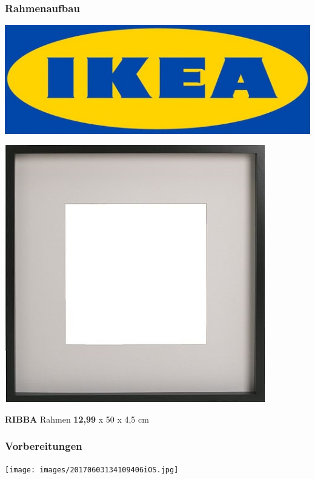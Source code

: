 \documentclass[11pt]{beamer}
\begin{document}
	\begin{frame}
		\frametitle{Rahmenaufbau}
		\begin{center}
			\includegraphics[scale = 0.2]{images/ikea.jpg}
		\end{center}
		\begin{center}
			\begin{minipage}[b]{0.4\textwidth}
				\includegraphics[scale = 0.35]{images/ribba-rahmen-schwarz.jpg}
			\end{minipage}
			\begin{minipage}[b]{0.4\textwidth}
				\textbf{RIBBA} \linebreak
				Rahmen \linebreak
				\textbf{12,99}  x 50 x 4,5 cm
			\end{minipage}
		\end{center}
	\end{frame}	
	
	\begin{frame}
		\frametitle{Vorbereitungen}
		\begin{center}
			\texttt{[image: images/20170603134109406iOS.jpg]}
		\end{center}
	\end{frame}
	
\end{document}
